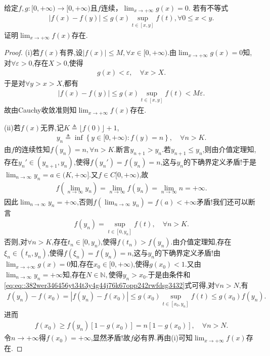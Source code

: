 \documentclass[../../main.tex]{subfiles}
\begin{document}
\begin{example}
给定$f,g:[0,+\infty) \to [0,+\infty)$且$f$连续，$\lim_{x \to +\infty} g(x) = 0$. 若有不等式
\begin{align*}
|f(x) - f(y)| \leqslant g(x) \sup_{t \in [x,y]} f(t), \forall 0 \leqslant x < y.
\end{align*}
证明$\lim_{x \to +\infty} f(x)$存在.
\end{example}
\begin{proof}
(i)若$f(x)$有界,设$|f(x)| \leqslant M, \forall x \in [0,+\infty)$.由$\lim_{x \to +\infty} g(x) = 0$知,对$\forall \varepsilon > 0$,存在$X > 0$,使得
\begin{align*}
g(x) < \varepsilon, \quad \forall x > X.
\end{align*}
于是对$\forall y > x > X$,都有
\begin{align*}
|f(x) - f(y)| \leqslant g(x) \sup_{t \in [x,y]} f(t) < M\varepsilon.
\end{align*}
故由Cauchy收敛准则知$\lim_{x \to +\infty} f(x)$存在.

(ii)若$f(x)$无界,记$K \triangleq \lfloor f(0) \rfloor + 1$,
\begin{align*}
y_n \triangleq \inf \left\{ y \in [0,+\infty) : f(y) = n \right\},\quad  \forall n > K.
\end{align*}
由$f$的连续性知$f(y_n) = n, \forall n > K$.断言$y_{n+1} > y_n$.若$y_{n+1} \leqslant y_n$,则由介值定理知,存在$y_n' \in (y_{n+1}, y_n)$,使得$f(y_n') = f(y_n) = n$,这与$y_n$的下确界定义矛盾!于是$\lim_{n \to \infty} y_n = a \in (K, +\infty]$.又$f \in C[0,+\infty)$,故
\begin{align*}
f\left( \lim_{n \to \infty} y_n \right) = \lim_{n \to \infty} f(y_n) = \lim_{n \to \infty} n = +\infty.
\end{align*}
因此$\lim_{n \to \infty} y_n = +\infty$,否则$f\left( \lim_{n \to \infty} y_n \right) = f(a) < +\infty$矛盾!我们还可以断言
\begin{align}
f(y_n) = \sup_{t \in [0,y_n]} f(t), \quad \forall n > K. \label{eq:eq::382wer346456yt34t3y4g44j76k67opp242rwfdsg3432}
\end{align}
否则,对$\forall n > K$,存在$t_n \in [0,y_n)$,使得$f(t_n) > f(y_n)$.由介值定理知,存在$\xi_n \in (t_n, y_n)$,使得$f(\xi_n) = f(y_n) = n$,这与$y_n$的下确界定义矛盾!由$\lim_{x\to +\infty}g(x)=0$知,存在$x_0 \in [0,+\infty)$,使得$g(x_0)<1$.又由$\lim_{n\to\infty}y_n=+\infty$知,存在$N\in \mathbb{N},$使得$y_n>x_0$.于是由条件和\eqref{eq:eq::382wer346456yt34t3y4g44j76k67opp242rwfdsg3432}式可得,对$\forall n > N$,有
\begin{align*}
f(y_n) - f(x_0) = |f(y_n) - f(x_0)| \leqslant g(x_0) \sup_{t \in [x_0,y_n]} f(t) \leqslant g(x_0) f(y_n).
\end{align*}
进而
\begin{align*}
f(x_0) \geqslant f(y_n) \left[ 1 - g(x_0) \right] = n \left[ 1 - g(x_0) \right], \quad \forall n > N.
\end{align*}
令$n \to +\infty$得$f(x_0) = +\infty$,显然矛盾!故$f$必有界.再由(i)可知$\lim_{x \to +\infty} f(x)$存在.

\end{proof}
\end{document}
